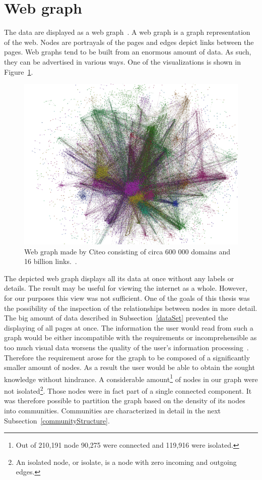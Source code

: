 \section{Web graph} \label{webGraph}
The data are displayed as a web graph~\cite{the_web_graph_overview}. A web graph is a graph representation of the web. Nodes are portrayals of the pages and edges depict links between the pages. Web graphs tend to be built from an enormous amount of data. As such, they can be advertised in various ways. One of the visualizations is shown in Figure~\ref{hugeWebGraphFireworks}. 
\begin{figure}[ht!]
  \centering
  \includegraphics[width=\textwidth]{Images/hugeWebGraphFireworks.png}
  \caption{Web graph made by Citeo consisting of circa 600 000 domains and 16 billion links.~\cite{hugeWebGraphFireworks}.}
  \label{hugeWebGraphFireworks}
\end{figure} 
The depicted web graph displays all its data at once without any labels or details. The result may be useful for viewing the internet as a whole. However, for our purposes this view was not sufficient. One of the goals of this thesis was the possibility of the inspection of the relationships between nodes in more detail. The big amount of data described in Subsection~\ref{dataSet} prevented the displaying of all pages at once. The information the user would read from such a graph would be either incompatible with the requirements or incomprehensible as too much visual data worsens the quality of the user's information processing~\cite{informationCluttering}. Therefore the requirement arose for the graph to be composed of a significantly smaller amount of nodes. As a result the user would be able to obtain the sought knowledge without hindrance. A considerable amount\footnote{Out of 210,191 node 90,275 were connected and 119,916 were isolated.} of nodes in our graph were not isolated\footnote{An isolated node, or isolate, is a node with zero incoming and outgoing edges.}. Those nodes were in fact part of a single connected component. It was therefore possible to partition the graph based on the density of its nodes into communities. Communities are characterized in detail in the next Subsection~\ref{communityStructure}.


